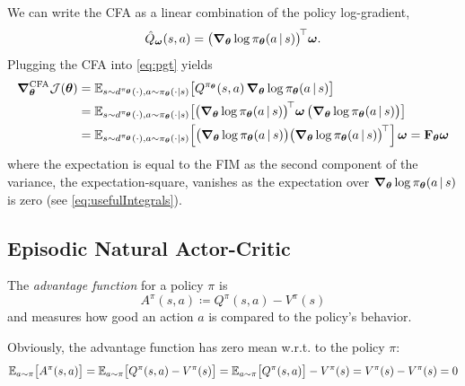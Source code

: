 			We can write the \ac{CFA} as a linear combination of the policy log-gradient,
			\begin{equation}
				\hat{Q}_{\bm{\omega}}(s, a) = \bigl( \grad_{\bm{\theta}} \log \pi_{\bm{\theta}}(a \,\vert\, s) \bigr)^{{\!\top\!}\,} \bm{\omega}.
			\end{equation}
			Plugging the \ac{CFA} into \eqref{eq:pgt} yields
			\begin{align}
				\grad_{\bm{\theta}}^\mathrm{CFA} \mathcal{J}(\bm{\theta})
					&= \mathbb{E}_{s \sim d^{\pi_{\bm{\theta}}}(\cdot), a \sim \pi_{\bm{\theta}}(\cdot \vert s)}\bigl[ Q^{\pi_{\bm{\theta}}}(s, a) \, \grad_{\bm{\theta}} \log \pi_{\bm{\theta}}(a \,\vert\, s) \bigr] \\
					&= \mathbb{E}_{s \sim d^{\pi_{\bm{\theta}}}(\cdot), a \sim \pi_{\bm{\theta}}(\cdot \vert s)}\bigl[ \bigl( \grad_{\bm{\theta}} \log \pi_{\bm{\theta}}(a \,\vert\, s) \bigr)^{{\!\top\!}\,} \bm{\omega} \, \bigl( \grad_{\bm{\theta}} \log \pi_{\bm{\theta}}(a \,\vert\, s) \bigr) \bigr] \\
					&= \mathbb{E}_{s \sim d^{\pi_{\bm{\theta}}}(\cdot), a \sim \pi_{\bm{\theta}}(\cdot \vert s)}\Bigl[ \bigl( \grad_{\bm{\theta}} \log \pi_{\bm{\theta}}(a \,\vert\, s) \bigr) \bigl( \grad_{\bm{\theta}} \log \pi_{\bm{\theta}}(a \,\vert\, s) \bigr)^{{\!\top\!}\,} \Bigr] \, \bm{\omega}
					 = \bm{\mathrm{F}}_{\bm{\theta}} \bm{\omega}
			\end{align}
			where the expectation is equal to the \ac{FIM} as the second component of the variance, the expectation-square, vanishes as the expectation over \( \grad_{\bm{\theta}} \log \pi_{\bm{\theta}}(a \,\vert\, s) \) is zero (see \eqref{eq:usefulIntegrals}).

		\subsection{Episodic Natural Actor-Critic}
			\begin{definition}
				The \emph{advantage function} for a policy \(\pi\) is
				\begin{equation}
					A^\pi(s, a) \coloneqq Q^\pi(s, a) - V^\pi(s)
				\end{equation}
				and measures how good an action \(a\) is compared to the policy's behavior.
			\end{definition}
			Obviously, the advantage function has zero mean w.r.t. to the policy \(\pi\):
			\begin{equation}
				\mathbb{E}_{a \sim \pi}\bigl[ A^\pi(s, a) \bigr]
					= \mathbb{E}_{a \sim \pi}\bigl[ Q^\pi(s, a) - V^\pi(s) \bigr]
					= \mathbb{E}_{a \sim \pi}\bigl[ Q^\pi(s, a) \bigr] - V^\pi(s)
					= V^\pi(s) - V^\pi(s)
					= 0
			\end{equation}

